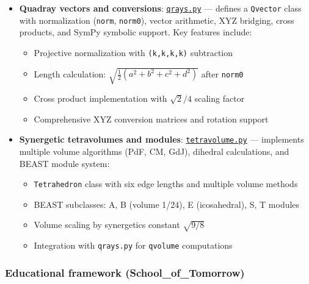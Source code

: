 \documentclass[
]{article}
\providecommand{\tightlist}{%
  \setlength{\itemsep}{0pt}\setlength{\parskip}{0pt}}
\begin{document}
\begin{itemize}
\tightlist
\item
  \textbf{Quadray vectors and conversions}:
  \href{https://github.com/4dsolutions/m4w/blob/main/qrays.py}{\texttt{qrays.py}}
  --- defines a \texttt{Qvector} class with normalization
  (\texttt{norm}, \texttt{norm0}), vector arithmetic, XYZ bridging,
  cross products, and SymPy symbolic support. Key features include:

  \begin{itemize}
  \tightlist
  \item
    Projective normalization with \texttt{(k,k,k,k)} subtraction
  \item
    Length calculation: \(\sqrt{\frac{1}{2}(a^2+b^2+c^2+d^2)}\) after
    \texttt{norm0}
  \item
    Cross product implementation with \(\sqrt{2}/4\) scaling factor
  \item
    Comprehensive XYZ conversion matrices and rotation support
  \end{itemize}
\item
  \textbf{Synergetic tetravolumes and modules}:
  \href{https://github.com/4dsolutions/m4w/blob/main/tetravolume.py}{\texttt{tetravolume.py}}
  --- implements multiple volume algorithms (PdF, CM, GdJ), dihedral
  calculations, and BEAST module system:

  \begin{itemize}
  \tightlist
  \item
    \texttt{Tetrahedron} class with six edge lengths and multiple volume
    methods
  \item
    BEAST subclasses: A, B (volume 1/24), E (icosahedral), S, T modules
  \item
    Volume scaling by synergetics constant \(\sqrt{9/8}\)
  \item
    Integration with \texttt{qrays.py} for \texttt{qvolume} computations
  \end{itemize}
\end{itemize}

\hypertarget{educational-framework-school_of_tomorrow}{%
\subsubsection{Educational framework
(School\_of\_Tomorrow)}\label{educational-framework-school_of_tomorrow}}
\end{document}
